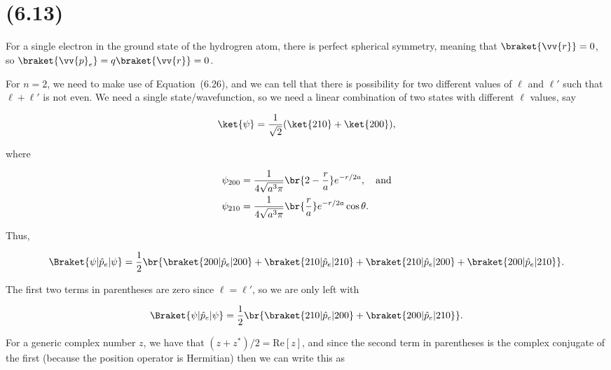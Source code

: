 \section{(6.13)}

\begin{parts}
\item For a single electron in the ground state of the hydrogren atom, there is perfect spherical symmetry, meaning that $\braket{\vv{r}}=0$, so $\braket{\vv{p}_e} = q\braket{\vv{r}} = 0$.


\item For $n=2$, we need to make use of Equation~(6.26), and we can tell that there is possibility for two different values of $\ell$ and $\ell'$ such that $\ell+\ell'$ is not even. We need a single state/wavefunction, so we need a linear combination of two states with different $\ell$ values, say

  \begin{equation}
    \ket{\psi} = \frac{1}{\sqrt{2}}(\ket{210} + \ket{200}),
  \end{equation}

  where

  \begin{align}
    \psi_{200} &= \frac{1}{4\sqrt{a^3\pi}}\br{2 - \frac{r}{a}} e^{-r/2a}, \quad\text{and} \\
    \psi_{210} &= \frac{1}{4\sqrt{a^3\pi}}\br{\frac{r}{a}} e^{-r/2a} \cos\theta.
  \end{align}

  Thus,

  \begin{equation}
    \Braket{\psi | \hat{p}_e | \psi} = \frac{1}{2}\br{\braket{200 | \hat{p}_e | 200} + \braket{210 | \hat{p}_e | 210} + \braket{210 | \hat{p}_e | 200} + \braket{200 | \hat{p}_e | 210}}.
  \end{equation}

  The first two terms in parentheses are zero since $\ell = \ell'$, so we are only left with

  \begin{equation}
    \Braket{\psi | \hat{p}_e | \psi} = \frac{1}{2}\br{\braket{210 | \hat{p}_e | 200} + \braket{200 | \hat{p}_e | 210}}.
  \end{equation}

  For a generic complex number $z$, we have that $(z+z^*)/2 = \mathrm{Re}[z]$, and since the second term in parentheses is the complex conjugate of the first (because the position operator is Hermitian) then we can write this as


\end{parts}
